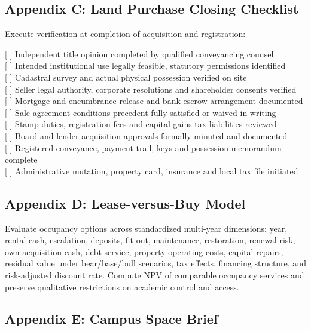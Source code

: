 \subsection{Appendix C: Land Purchase Closing Checklist}

Execute verification at completion of acquisition and registration:

\begin{tcolorbox}[colback=BayesCanvas,colframe=BayesDark,arc=1mm,title=\textbf{Appendix C: Land Purchase Closing Checklist}]
\scriptsize\ttfamily
{[ ]} Independent title opinion completed by qualified conveyancing counsel\\
{[ ]} Intended institutional use legally feasible, statutory permissions identified\\
{[ ]} Cadastral survey and actual physical possession verified on site\\
{[ ]} Seller legal authority, corporate resolutions and shareholder consents verified\\
{[ ]} Mortgage and encumbrance release and bank escrow arrangement documented\\
{[ ]} Sale agreement conditions precedent fully satisfied or waived in writing\\
{[ ]} Stamp duties, registration fees and capital gains tax liabilities reviewed\\
{[ ]} Board and lender acquisition approvals formally minuted and documented\\
{[ ]} Registered conveyance, payment trail, keys and possession memorandum complete\\
{[ ]} Administrative mutation, property card, insurance and local tax file initiated
\end{tcolorbox}

\subsection{Appendix D: Lease-versus-Buy Model}

Evaluate occupancy options across standardized multi-year dimensions: year, rental cash, escalation, deposits, fit-out, maintenance, restoration, renewal risk, own acquisition cash, debt service, property operating costs, capital repairs, residual value under bear/base/bull scenarios, tax effects, financing structure, and risk-adjusted discount rate. Compute NPV of comparable occupancy services and preserve qualitative restrictions on academic control and access.

\subsection{Appendix E: Campus Space Brief}

